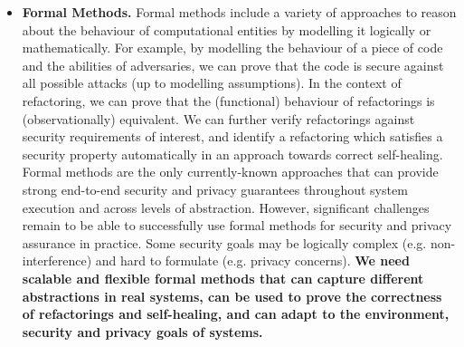 \documentclass[a4paper,11pt]{article}
\begin{document}
\begin{itemize}
\item \textbf{Formal Methods.}
Formal methods include a variety of approaches to reason about the behaviour
of computational entities by modelling it logically or mathematically. For example, by modelling the behaviour of a piece of code and the abilities of adversaries, we can prove that the code is secure against all possible attacks (up to modelling assumptions). In the context of refactoring, we can prove that the (functional) behaviour of refactorings
is (observationally) equivalent. We can further verify refactorings against security requirements of interest, and identify a refactoring which satisfies a security property automatically in an approach towards correct self-healing.
Formal methods
are the only currently-known approaches that can provide strong end-to-end security and privacy guarantees throughout system execution and across levels of abstraction. However, significant challenges remain to be able to
successfully use formal methods for security and privacy assurance in practice.
Some security goals may be logically complex (e.g. non-interference) and hard to formulate (e.g. privacy concerns).
\textbf{We need scalable and flexible formal methods that can capture different abstractions in real systems, can be used to prove the correctness of refactorings and self-healing, and can adapt to the environment, security and privacy goals of systems.}


\end{itemize}
\end{document}

